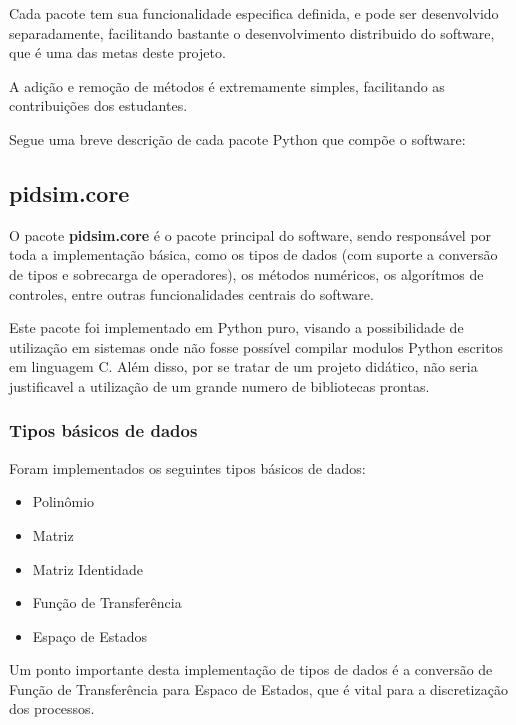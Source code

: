     Cada pacote tem sua funcionalidade especifica definida, e pode ser desenvolvido
    separadamente, facilitando bastante o desenvolvimento distribuido do software,
    que é uma das metas deste projeto.

    A adição e remoção de métodos é extremamente simples, facilitando as contribuições
    dos estudantes.

    Segue uma breve descrição de cada pacote Python que compõe o software:

    \subsection{pidsim.core}

        O pacote \textbf{pidsim.core} é o pacote principal do software, sendo responsável
        por toda a implementação básica, como os tipos de dados (com suporte a conversão
        de tipos e sobrecarga de operadores), os métodos numéricos, os algorítmos de controles,
        entre outras funcionalidades centrais do software.

        Este pacote foi implementado em Python puro, visando a possibilidade de utilização
        em sistemas onde não fosse possível compilar modulos Python escritos em linguagem C.
        Além disso, por se tratar de um projeto didático, não seria justificavel a utilização
        de um grande numero de bibliotecas prontas.

        \subsubsection{Tipos básicos de dados}

            Foram implementados os seguintes tipos básicos de dados:
        
            \begin{itemize}
                \item Polinômio
                \item Matriz
                \item Matriz Identidade
                \item Função de Transferência
                \item Espaço de Estados
            \end{itemize}

            Um ponto importante desta implementação de tipos de dados é a conversão de Função
            de Transferência para Espaco de Estados, que é vital para a discretização dos
            processos.

